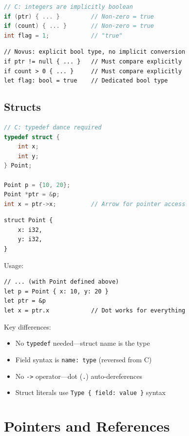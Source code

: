 \begin{lstlisting}[language=C]
// C: integers are implicitly boolean
if (ptr) { ... }         // Non-zero = true
if (count) { ... }       // Non-zero = true
int flag = 1;            // "true"
\end{lstlisting}

\begin{lstlisting}
// Novus: explicit bool type, no implicit conversion
if ptr != null { ... }   // Must compare explicitly
if count > 0 { ... }     // Must compare explicitly
let flag: bool = true    // Dedicated bool type
\end{lstlisting}

\subsection{Structs}

\begin{lstlisting}[language=C]
// C: typedef dance required
typedef struct {
    int x;
    int y;
} Point;

Point p = {10, 20};
Point *ptr = &p;
int x = ptr->x;          // Arrow for pointer access
\end{lstlisting}

\begin{lstlisting}
struct Point {
    x: i32,
    y: i32,
}
\end{lstlisting}

Usage:

\begin{lstlisting}
// ... (with Point defined above)
let p = Point { x: 10, y: 20 }
let ptr = &p
let x = ptr.x            // Dot works for everything
\end{lstlisting}

Key differences:
\begin{itemize}
    \item No \texttt{typedef} needed---struct name is the type
    \item Field syntax is \texttt{name: type} (reversed from C)
    \item No \texttt{->} operator---dot (\texttt{.}) auto-dereferences
    \item Struct literals use \texttt{Type \{ field: value \}} syntax
\end{itemize}

\section{Pointers and References}

